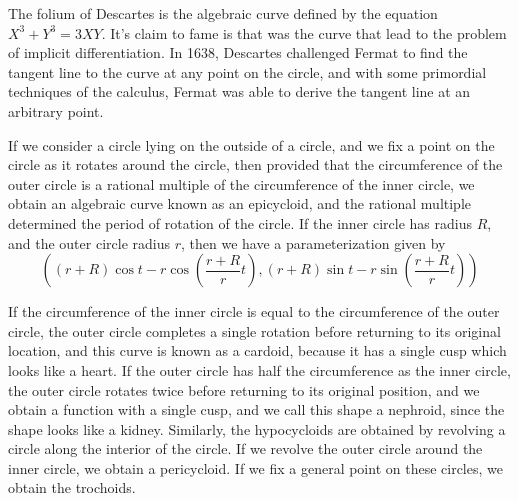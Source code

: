 \begin{example}
    The folium of Descartes is the algebraic curve defined by the equation $X^3 + Y^3 = 3XY$. It's claim to fame is that was the curve that lead to the problem of implicit differentiation. In 1638, Descartes challenged Fermat to find the tangent line to the curve at any point on the circle, and with some primordial techniques of the calculus, Fermat was able to derive the tangent line at an arbitrary point.
\end{example}

\begin{example}
    If we consider a circle lying on the outside of a circle, and we fix a point on the circle as it rotates around the circle, then provided that the circumference of the outer circle is a rational multiple of the circumference of the inner circle, we obtain an algebraic curve known as an epicycloid, and the rational multiple determined the period of rotation of the circle. If the inner circle has radius $R$, and the outer circle radius $r$, then we have a parameterization given by
    \[ \left( (r + R) \cos t - r \cos \left(\frac{r + R}{r}t \right), (r + R) \sin t - r \sin \left( \frac{r + R}{r}t \right) \right) \]



    If the circumference of the inner circle is equal to the circumference of the outer circle, the outer circle completes a single rotation before returning to its original location, and this curve is known as a cardoid, because it has a single cusp which looks like a heart. If the outer circle has half the circumference as the inner circle, the outer circle rotates twice before returning to its original position, and we obtain a function with a single cusp, and we call this shape a nephroid, since the shape looks like a kidney. Similarly, the hypocycloids are obtained by revolving a circle along the interior of the circle. If we revolve the outer circle around the inner circle, we obtain a pericycloid. If we fix a general point on these circles, we obtain the trochoids.
\end{example}


